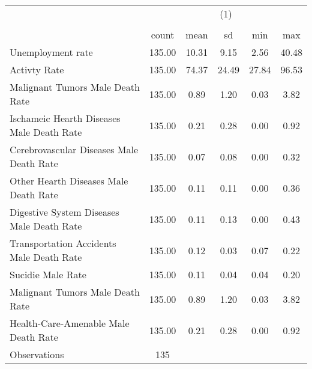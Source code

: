 {
\def\sym#1{\ifmmode^{#1}\else\(^{#1}\)\fi}
\begin{tabular}{l*{1}{ccccc}}
\hline\hline
                    &\multicolumn{5}{c}{(1)}                                                  \\
                    &\multicolumn{5}{c}{}                                                     \\
                    &       count         &        mean&          sd&         min&         max\\
\hline
Unemployment rate   &      135.00         &       10.31&        9.15&        2.56&       40.48\\
Activty Rate        &      135.00         &       74.37&       24.49&       27.84&       96.53\\
Malignant Tumors Male Death Rate&      135.00         &        0.89&        1.20&        0.03&        3.82\\
Ischameic Hearth Diseases Male Death Rate&      135.00         &        0.21&        0.28&        0.00&        0.92\\
Cerebrovascular Diseases Male Death Rate&      135.00         &        0.07&        0.08&        0.00&        0.32\\
Other Hearth Diseases Male Death Rate&      135.00         &        0.11&        0.11&        0.00&        0.36\\
Digestive System Diseases Male Death Rate&      135.00         &        0.11&        0.13&        0.00&        0.43\\
Transportation Accidents Male Death Rate&      135.00         &        0.12&        0.03&        0.07&        0.22\\
Sucidie Male Rate   &      135.00         &        0.11&        0.04&        0.04&        0.20\\
Malignant Tumors Male Death Rate&      135.00         &        0.89&        1.20&        0.03&        3.82\\
Health-Care-Amenable Male Death Rate&      135.00         &        0.21&        0.28&        0.00&        0.92\\
\hline
Observations        &         135         &            &            &            &            \\
\hline\hline
\end{tabular}
}
